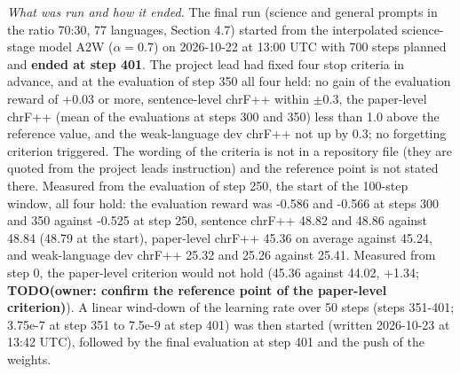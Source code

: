 \emph{What was run and how it ended.} The final run (science and general prompts in the ratio 70:30, 77 languages, Section 4.7) started from the interpolated science-stage model A2W (\(\alpha=0.7\)) on 2026-10-22 at 13:00 UTC with 700 steps planned and \textbf{ended at step 401}. The project lead had fixed four stop criteria in advance, and at the evaluation of step 350 all four held: no gain of the evaluation reward of +0.03 or more, sentence-level chrF++ within \(\pm 0.3\), the paper-level chrF++ (mean of the evaluations at steps 300 and 350) less than 1.0 above the reference value, and the weak-language dev chrF++ not up by 0.3; no forgetting criterion triggered. The wording of the criteria is not in a repository file (they are quoted from the project lead\textquotesingle s instruction) and the reference point is not stated there. Measured from the evaluation of step 250, the start of the 100-step window, all four hold: the evaluation reward was -0.586 and -0.566 at steps 300 and 350 against -0.525 at step 250, sentence chrF++ 48.82 and 48.86 against 48.84 (48.79 at the start), paper-level chrF++ 45.36 on average against 45.24, and weak-language dev chrF++ 25.32 and 25.26 against 25.41. Measured from step 0, the paper-level criterion would not hold (45.36 against 44.02, +1.34; {\color{red}\textbf{TODO(owner: confirm the reference point of the paper-level criterion)}}). A linear wind-down of the learning rate over 50 steps (steps 351-401; 3.75e-7 at step 351 to 7.5e-9 at step 401) was then started (written 2026-10-23 at 13:42 UTC), followed by the final evaluation at step 401 and the push of the weights.

